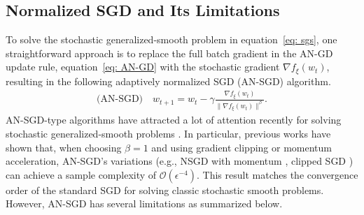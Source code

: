 \documentclass[10pt]{article} %
\def\eqref#1{equation~\ref{#1}}
\begin{document}
\subsection{Normalized SGD and Its Limitations}
To solve the stochastic generalized-smooth problem in \eqref{eq: sgs}, one straightforward approach is to replace the full batch gradient in the AN-GD update rule, \eqref{eq: AN-GD} with the stochastic gradient $\nabla f_\xi(w_t)$, resulting in the following adaptively normalized SGD (AN-SGD) algorithm.
\begin{align}\label{eq: NSGD}
    \text{(AN-SGD)} \quad w_{t+1} = w_t - \gamma \frac{\nabla f_{\xi}(w_t)}{ \| \nabla f_{\xi}(w_t) \|^{\beta}}.
\end{align}
AN-SGD-type algorithms have attracted a lot of attention recently for solving stochastic
generalized-smooth problems \citep{zhang2020gradientclippingacceleratestraining,genralclip,mingruiclip,jin2021nonconvex}. 
In particular, previous works have shown that, when choosing $\beta=1$ and using gradient clipping or momentum acceleration, AN-SGD's variations (e.g., NSGD with momentum \citep{NSGDm, jin2021nonconvex}, clipped SGD \citep{zhang2020gradientclippingacceleratestraining,genralclip}) can achieve a sample complexity of $\mathcal{O}(\epsilon^{-4})$. This result matches the convergence order of the standard SGD \citep{ghadimi2013stochastic} for solving classic stochastic smooth problems. 
However, AN-SGD has several limitations as summarized below. 
\end{document}
